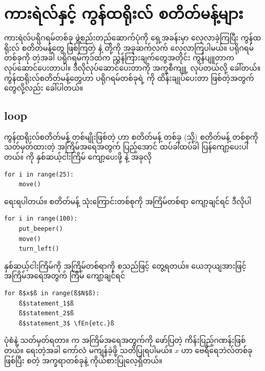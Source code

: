 \chapter{ကားရဲလ်နှင့် ကွန်ထရိုးလ် စတိတ်မန့်များ}\label{ch:ch02}


ကားရဲလ်ပရိုဂရမ်တစ်ခု ဖွဲ့စည်းတည်ဆောက်ပုံကို ရှေ့အခန်းမှာ လေ့လာခဲ့ကြပြီး ကွန်ထရိုးလ် စတိတ်မန့်တွေ ဖြစ်ကြတဲ့  \fEn{,}  \fEn{,}  နဲ့  တို့ကို အခုဆက်လက် လေ့လာကြပါမယ်။ ပရိုဂရမ်တစ်ခုကို  တဲ့အခါ ပရိုဂရမ်ကုဒ်ထဲက ညွှန်ကြားချက်တွေအတိုင်း ကွန်ပျူတာက လုပ်ဆောင်ပေးတာပါ။ ဒီလိုလုပ်ဆောင်ပေးတာကို အက္ခစီကျူ့  လုပ်တယ်လို့ ခေါ်တယ်။ ကွန်ထရိုးလ်စတိတ်မန့်တွေဟာ ပရိုဂရမ်တစ်ခုရဲ့  ကို ထိန်းချုပ်ပေးတာ ဖြစ်တဲ့အတွက်  တွေလို့လည်း ခေါ်ပါတယ်။

\section{ loop}

ကွန်ထရိုးလ်စတိတ်မန့် တစ်မျိုးဖြစ်တဲ့   ဟာ စတိတ်မန့် တစ်ခု (သို့) စတိတ်မန့် တစ်စုကို သတ်မှတ်ထားတဲ့ အကြိမ်အရေအတွက် ပြည့်အောင် ထပ်ခါထပ်ခါ ပြန်ကျော့ပေးပါတယ်။   ကို နှစ်ဆယ့်ငါးကြိမ် ကျော့ပေးဖို့   နဲ့ အခုလို 
%
\setlength{\fboxsep}{0pt}
\begin{verbatim}
for i in range(25):
    move()
\end{verbatim}
%
ရေးရပါတယ်။ \fEn{,} \fEn{,}  စတိတ်မန့် သုံးကြောင်းတစ်စုကို အကြိမ်တစ်ရာ ကျော့ချင်ရင် ဒီလိုပါ 
%
\setlength{\fboxsep}{0pt}
\begin{verbatim}
for i in range(100):
    put_beeper()
    move()
    turn_left()
\end{verbatim}
%

နှစ်ဆယ့်ငါးကြိမ်ကို \fEn{,} အကြိမ်တစ်ရာကို  စသည်ဖြင့် တွေ့ရတယ်။ ယေဘု\allowbreak ယျအားဖြင့် အကြိမ်အရေအတွက်  ကြိမ် ကျော့ချင်ရင်  
%
\setlength{\fboxsep}{0pt}
\begin{verbatim}
for ß$x$ß in range(ß$N$ß):
    ß$statement_1$ß
    ß$statement_2$ß
    ß$statement_3$ \fEn{etc.}ß
\end{verbatim}
%
ပုံစံနဲ့ သတ်မှတ်ရတာ။  က  အကြိမ်အရေအတွက်ကို ဖော်ပြတဲ့ ကိန်းပြည့်ဂဏန်းဖြစ်တယ်။   ရေးတဲ့အခါ ကော်လံ \fCode{:} မကျန်ခဲ့ဖို့ သတိပြုရပါမယ်။ $x$ ဟာ ဗေရီရေဘဲလ်တစ်ခုဖြစ်ပြီး \fEn{,} \fEn{,}  စတဲ့ အက္ခရာတစ်ခုနဲ့ ကိုယ်စားပြုလေ့ရှိတယ်။

